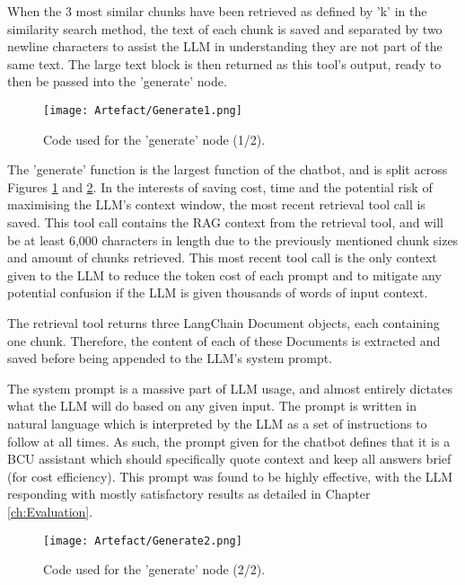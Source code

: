 \para When the 3 most similar chunks have been retrieved as defined by 'k' in the similarity search method, the text of each chunk 
is saved and separated by two newline characters to assist the LLM in understanding they are not part of the same text. The large 
text block is then returned as this tool's output, ready to then be passed into the 'generate' node. 

\begin{figure}[H]
    \centering
    \texttt{[image: Artefact/Generate1.png]}
    \caption{Code used for the 'generate' node (1/2). \label{fig:Generate1}}
\end{figure}

\noindent The 'generate' function is the largest function of the chatbot, and is split across 
Figures \ref{fig:Generate1} and \ref{fig:Generate2}. In the interests of saving 
cost, time and the potential risk of maximising the LLM's context window, the most recent retrieval tool 
call is saved. This tool call contains the RAG context from the retrieval tool, and will be at least 
6,000 characters in length due to the previously mentioned chunk sizes and amount of chunks retrieved.
This most recent tool call is the only context given to the LLM to reduce the token cost of each prompt 
and to mitigate any potential confusion if the LLM is given thousands of words of input context.

\para The retrieval tool returns three LangChain Document objects, each containing one chunk.  
Therefore, the content of each of these Documents is extracted and saved before being appended to the 
LLM's system prompt.

\para The system prompt is a massive part of LLM usage, and almost entirely dictates what the LLM will do 
based on any given input. The prompt is written in natural language which is interpreted by the LLM as a set 
of instructions to follow at all times. As such, the prompt given for the chatbot defines that it is 
a BCU assistant which should specifically quote context and keep all answers brief (for cost efficiency).
This prompt was found to be highly effective, with the LLM responding with mostly satisfactory results as 
detailed in Chapter \ref{ch:Evaluation}.

\begin{figure}[H]
    \centering
    \texttt{[image: Artefact/Generate2.png]}
    \caption{Code used for the 'generate' node (2/2). \label{fig:Generate2}}
\end{figure}

